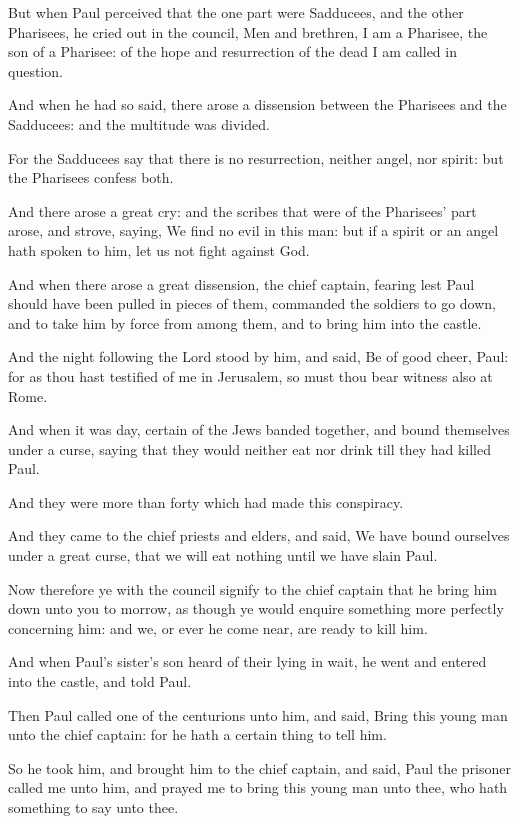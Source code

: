 \verse But when Paul perceived that the one part were Sadducees, and the other Pharisees, he cried out in the council, Men and brethren, I am a Pharisee, the son of a Pharisee: of the hope and resurrection of the dead I am called in question.

\verse And when he had so said, there arose a dissension between the Pharisees and the Sadducees: and the multitude was divided.

\verse For the Sadducees say that there is no resurrection, neither angel, nor spirit: but the Pharisees confess both.

\verse And there arose a great cry: and the scribes that were of the Pharisees' part arose, and strove, saying, We find no evil in this man: but if a spirit or an angel hath spoken to him, let us not fight against God.

\verse And when there arose a great dissension, the chief captain, fearing lest Paul should have been pulled in pieces of them, commanded the soldiers to go down, and to take him by force from among them, and to bring him into the castle.

\verse And the night following the Lord stood by him, and said, Be of good cheer, Paul: for as thou hast testified of me in Jerusalem, so must thou bear witness also at Rome.

\verse And when it was day, certain of the Jews banded together, and bound themselves under a curse, saying that they would neither eat nor drink till they had killed Paul.

\verse And they were more than forty which had made this conspiracy.

\verse And they came to the chief priests and elders, and said, We have bound ourselves under a great curse, that we will eat nothing until we have slain Paul.

\verse Now therefore ye with the council signify to the chief captain that he bring him down unto you to morrow, as though ye would enquire something more perfectly concerning him: and we, or ever he come near, are ready to kill him.

\verse And when Paul's sister's son heard of their lying in wait, he went and entered into the castle, and told Paul.

\verse Then Paul called one of the centurions unto him, and said, Bring this young man unto the chief captain: for he hath a certain thing to tell him.

\verse So he took him, and brought him to the chief captain, and said, Paul the prisoner called me unto him, and prayed me to bring this young man unto thee, who hath something to say unto thee.

